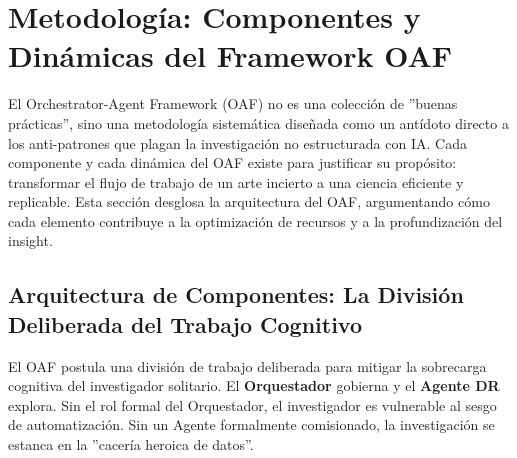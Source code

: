 \documentclass[11pt, a4paper]{article}
\begin{document}
\section{Metodología: Componentes y Dinámicas del Framework OAF}
\label{sec:metodologia}

El Orchestrator-Agent Framework (OAF) no es una colección de ''buenas prácticas'', sino una metodología sistemática diseñada como un antídoto directo a los anti-patrones que plagan la investigación no estructurada con IA. Cada componente y cada dinámica del OAF existe para justificar su propósito: transformar el flujo de trabajo de un arte incierto a una ciencia eficiente y replicable. Esta sección desglosa la arquitectura del OAF, argumentando cómo cada elemento contribuye a la optimización de recursos y a la profundización del insight.

\subsection{Arquitectura de Componentes: La División Deliberada del Trabajo Cognitivo}
El OAF postula una división de trabajo deliberada para mitigar la sobrecarga cognitiva del investigador solitario. El \textbf{Orquestador} gobierna y el \textbf{Agente DR} explora. Sin el rol formal del Orquestador, el investigador es vulnerable al sesgo de automatización. Sin un Agente formalmente comisionado, la investigación se estanca en la ''cacería heroica de datos''.
\end{document}
